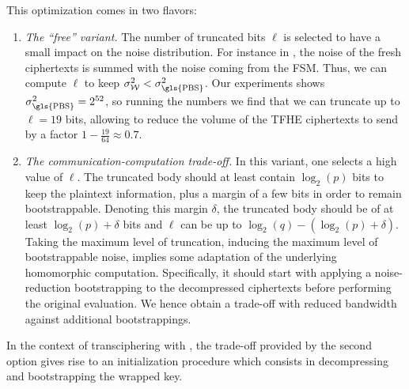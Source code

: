 \noindent This optimization comes in two flavors:
\begin{enumerate}
	\item \emph{The ``free'' variant.} The number of truncated bits $\ell$ is selected to have a small impact on the noise distribution. For instance in \coolName, the noise of the fresh ciphertexts is summed with the noise coming from the FSM. Thus, we can compute $\ell$ to keep $\sigma^2_{\mathcal W} < \sigma^2_{\text{\gls{PBS}}}$. Our experiments shows $\sigma^2_{\text{\gls{PBS}}} = 2^{52}$, so running the numbers we find that we can truncate up to $\ell=19$ bits, allowing to reduce the volume of the \gls{TFHE} ciphertexts to send by a factor $1 - \frac{19}{64} \approx 0.7$.
	
	\smallskip
	
	\item \emph{The communication-computation trade-off.} In this variant, one selects a high value of $\ell$. The truncated body should at least contain $\log_2(p)$ bits to keep the plaintext information, plus a margin of a few bits in order to remain bootstrappable. Denoting this margin $\delta$, the truncated body should be of at least $\log_2(p) + \delta$ bits and $\ell$ can be up to $\log_2(q) - (\log_2(p)+\delta)$. Taking the maximum level of truncation, inducing the maximum level of bootstrappable noise, implies some adaptation of the underlying homomorphic computation. Specifically, it should start with applying a noise-reduction bootstrapping to the decompressed ciphertexts before performing the original evaluation. We hence obtain a trade-off with reduced bandwidth against additional bootstrappings.
\end{enumerate}

In the context of transciphering with \coolName, the trade-off provided by the second option gives rise to an initialization procedure which consists in decompressing and bootstrapping the wrapped key. 


\ifeprint{

}
\fi





